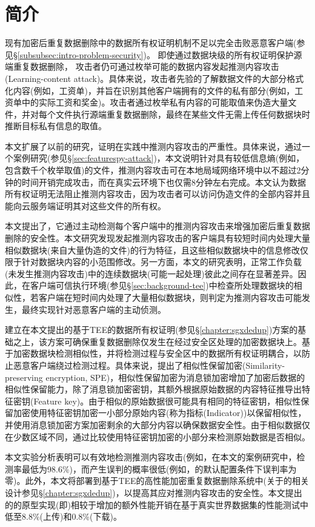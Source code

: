 \section{简介}
\label{sec:featurespy-intro}

现有加密后重复数据删除中的数据所有权证明机制不足以完全击败恶意客户端(参见\S\ref{subsubsec:intro-problem-security})。 即使通过数据块级的所有权证明保护源端重复数据删除， 攻击者仍可通过枚举可能的数据内容发起推测内容攻击(Learning-content attack)\cite{harnik2010side, zuo2018mitigating}。具体来说，攻击者先验的了解数据文件的大部分格式化内容(例如，工资单)，并旨在识别其他客户端拥有的文件的私有部分(例如，工资单中的实际工资和奖金)。攻击者通过枚举私有内容的可能取值来伪造大量文件，并对每个文件执行源端重复数据删除，最终在某些文件无需上传任何数据块时推断目标私有信息的取值。

本文扩展了以前的研究\cite{harnik2010side, zuo2018mitigating}，证明在实践中推测内容攻击的严重性。具体来说，通过一个案例研究(参见\S\ref{sec:featurespy-attack})，本文说明针对具有较低信息熵(例如，包含数千个枚举取值)的文件，推测内容攻击可在本地局域网络环境中以不超过2分钟的时间开销完成攻击，而在真实云环境下也仅需8分钟左右完成。本文认为数据所有权证明无法阻止推测内容攻击，因为攻击者可以访问伪造文件的全部内容并且能向云服务端证明其对这些文件的所有权。

本文提出了\sysnameF，它通过主动检测每个客户端中的推测内容攻击来增强加密后重复数据删除的安全性。本文研究发现发起推测内容攻击的客户端具有较短时间内处理大量相似数据块(来自大量伪造的文件)的行为特征，且这些相似数据块中的信息修改仅限于针对数据块内容的小范围修改。另一方面，本文的研究表明，正常工作负载(未发生推测内容攻击)中的连续数据块(可能一起处理)彼此之间存在显著差异。因此，\sysnameF 在客户端可信执行环境(参见\S\ref{sec:background-tee})中检查所处理数据块的相似性，若客户端在短时间内处理了大量相似数据块，则判定为推测内容攻击可能发生，最终实现针对恶意客户端的主动侦测。

\sysnameF 建立在本文提出的基于TEE的数据所有权证明(参见\S\ref{chapter:sgxdedup})方案的基础之上，该方案可确保重复数据删除仅发生在经过安全区处理的加密数据块上。\sysnameF 基于加密数据块检测相似性，并将检测过程与安全区中的数据所有权证明耦合，以防止恶意客户端绕过检测过程。具体来说，\sysnameF 提出了相似性保留加密(Similarity-preserving
encryption, SPE)，相似性保留加密为消息锁加密增加了加密后数据的相似性保留能力，除了消息锁加密密钥，其额外根据原始数据的内容特征推导出特征密钥(Feature key)。由于相似的原始数据很可能具有相同的特征密钥，相似性保留加密使用特征密钥加密一小部分原始内容(称为指标(Indicator))以保留相似性，并使用消息锁加密方案加密剩余的大部分内容以确保数据安全性。由于相似数据仅在少数区域不同，\sysnameF 通过比较使用特征密钥加密的小部分来检测原始数据是否相似。

本文实验分析表明\sysnameF 可以有效地检测推测内容攻击(例如，在本文的案例研究中，检测率最低为98.6\%)，而产生误判的概率很低(例如，\sysnameF 的默认配置条件下误判率为零)。此外，本文将\sysnameF 部署到基于TEE的高性能加密重复数据删除系统\sysnameS 中(关于\sysnameS 的相关设计参见\S\ref{chapter:sgxdedup})，以提高其应对推测内容攻击的安全性。本文提出的\sysnameF 的原型实现(即\prototype)相较于\sysnameS 增加的额外性能开销在基于真实世界数据集的性能测试中低至8.8\%(上传)和0.8\%(下载)。